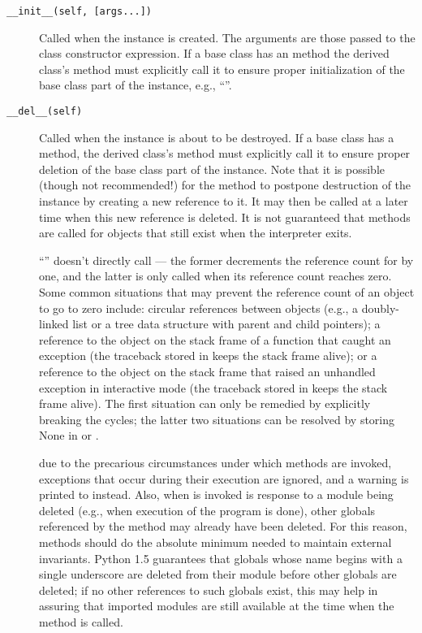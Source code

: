 \begin{description}

\item[{\tt __init__(self, [args...])}]
Called when the instance is created.  The arguments are those passed
to the class constructor expression.  If a base class has an
 method the derived class's  method must
explicitly call it to ensure proper initialization of the base class
part of the instance, e.g., ``''.


\item[{\tt __del__(self)}]
Called when the instance is about to be destroyed.  If a base class
has a  method, the derived class's  method
must explicitly call it to ensure proper deletion of the base class
part of the instance.  Note that it is possible (though not recommended!)
for the 
method to postpone destruction of the instance by creating a new
reference to it.  It may then be called at a later time when this new
reference is deleted.  It is not guaranteed that
 methods are called for objects that still exist when
the interpreter exits.

 ``'' doesn't directly call
 --- the former decrements the reference count for
 by one, and the latter is only called when its reference
count reaches zero.  Some common situations that may prevent the
reference count of an object to go to zero include: circular
references between objects (e.g., a doubly-linked list or a tree data
structure with parent and child pointers); a reference to the object
on the stack frame of a function that caught an exception (the
traceback stored in  keeps the stack frame
alive); or a reference to the object on the stack frame that raised an
unhandled exception in interactive mode (the traceback stored in
 keeps the stack frame alive).  The first
situation can only be remedied by explicitly breaking the cycles; the
latter two situations can be resolved by storing None in
 or .

 due to the precarious circumstances under which
 methods are invoked, exceptions that occur during their
execution are ignored, and a warning is printed to 
instead.  Also, when  is invoked is response to a module
being deleted (e.g., when execution of the program is done), other
globals referenced by the  method may already have been
deleted.  For this reason,  methods should do the
absolute minimum needed to maintain external invariants.  Python 1.5
guarantees that globals whose name begins with a single underscore are
deleted from their module before other globals are deleted; if no
other references to such globals exist, this may help in assuring that
imported modules are still available at the time when the
 method is called. 


\end{description}
